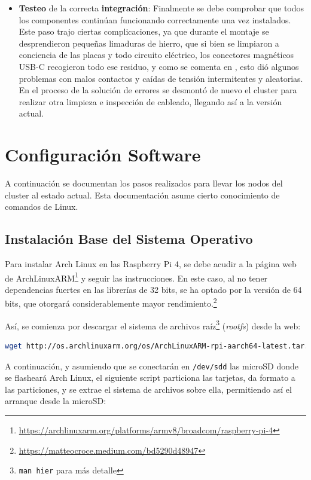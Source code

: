 \begin{itemize}
    \item \textbf{Testeo} de la correcta \textbf{integración}: Finalmente se debe comprobar que todos los componentes continúan funcionando correctamente una vez instalados. Este paso trajo ciertas complicaciones, ya que durante el montaje se desprendieron pequeñas limaduras de hierro, que si bien se limpiaron a conciencia de las placas y todo circuito eléctrico, los conectores magnéticos USB-C recogieron todo ese residuo, y como se comenta en , esto dió algunos problemas con malos contactos y caídas de tensión intermitentes y aleatorias. En el proceso de la solución de errores se desmontó de nuevo el cluster para realizar otra limpieza e inspección de cableado, llegando así a la versión actual.
\end{itemize}

\section{Configuración Software}
\label{sec:configuracion_software}
A continuación se documentan los pasos realizados para llevar los nodos del cluster al estado actual. Esta documentación asume cierto conocimiento de comandos de Linux.

\subsection{Instalación Base del Sistema Operativo}
\label{ssec:instalacion_sistema_operativo}
Para instalar Arch Linux en las Raspberry Pi 4, se debe acudir a la página web de ArchLinuxARM\footnote{\url{https://archlinuxarm.org/platforms/armv8/broadcom/raspberry-pi-4}} y seguir las instrucciones. En este caso, al no tener dependencias fuertes en las librerías de 32 bits, se ha optado por la versión de 64 bits, que otorgará considerablemente mayor rendimiento.\footnote{\url{https://matteocroce.medium.com/bd5290d48947}}

Así, se comienza por descargar el sistema de archivos raíz\footnote{\texttt{man hier} para más detalle} (\textit{\gls{rootfs}}) desde la web:

\begin{lstlisting}[language=bash,basicstyle=\scriptsize]
wget http://os.archlinuxarm.org/os/ArchLinuxARM-rpi-aarch64-latest.tar.gz
\end{lstlisting}

A continuación, y asumiendo que se conectarán en \texttt{/dev/sdd} las microSD donde se flasheará Arch Linux, el siguiente script particiona las tarjetas, da formato a las particiones, y se extrae el sistema de archivos sobre ella, permitiendo así el arranque desde la microSD:

